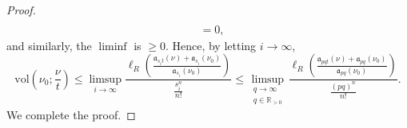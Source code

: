 \documentclass[10pt,a4paper]{amsart}
\newcommand{\R}{\mathbb{R}}
\begin{document}
\begin{proof}
$$\begin{aligned}
\\ &=0,
\end{aligned}
$$
and similarly, the $\liminf$ is $\ge 0$. Hence, by letting $i\to \infty$,
$$ \mathrm{vol}\left(\nu_0;\frac{\nu}{t}\right)\le \limsup_{i\to \infty}\frac{\ell_R\left(\frac{\mathfrak{a}_{s_it}(\nu)+\mathfrak{a}_{s_i}(\nu_0)}{\mathfrak{a}_{s_i}(\nu_0)}\right)}{\frac{s^n_i}{n!}}\le \limsup_{\substack{q\to \infty \\ q\in \R_{>0}}}\frac{\ell_R\left(\frac{\mathfrak{a}_{pqt}(\nu)+\mathfrak{a}_{pq}(\nu_0)}{\mathfrak{a}_{pq}(\nu_0)}\right)}{\frac{(pq)^n}{n!}}.$$
We complete the proof.
\end{proof}
\end{document}
